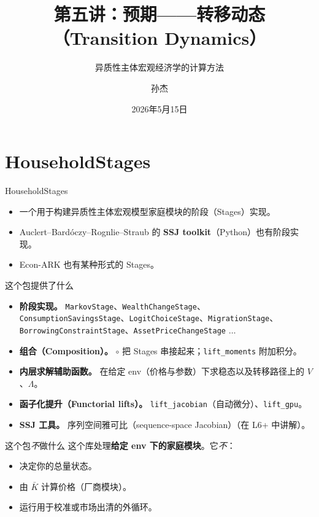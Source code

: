 \documentclass[10pt,aspectratio=169]{beamer}
\title{第五讲：预期——转移动态（Transition Dynamics）}
\subtitle{异质性主体宏观经济学的计算方法}
\author{孙杰}
\institute{多伦多大学}
\date{2026年5月15日}
\begin{document}
\maketitle

\section[HouseholdStages]{HouseholdStages}

\begin{frame}{HouseholdStages}
  \begin{itemize}
    \item 一个用于构建异质性主体宏观模型家庭模块的阶段（Stages）实现。
    \item Auclert--Bardóczy--Rognlie--Straub 的 \textbf{SSJ toolkit}（Python）也有阶段实现。
    \item Econ-ARK 也有某种形式的 Stages。
  \end{itemize}
\end{frame}

\begin{frame}{这个包提供了什么}
  \begin{itemize}
    \item \textbf{阶段实现。} \texttt{MarkovStage}、\texttt{WealthChangeStage}、\texttt{ConsumptionSavingsStage}、\texttt{LogitChoiceStage}、\texttt{MigrationStage}、\texttt{BorrowingConstraintStage}、\texttt{AssetPriceChangeStage} $\dots$
    \item \textbf{组合（Composition）。} \texttt{$\circ$} 把 Stages 串接起来；\texttt{lift\_moments} 附加积分。
    \item \textbf{内层求解辅助函数。} 在给定 env（价格与参数）下求稳态以及转移路径上的 $V$、$\Lambda$。
    \item \textbf{函子化提升（Functorial lifts）。} \texttt{lift\_jacobian}（自动微分）、\texttt{lift\_gpu}。
    \item \textbf{SSJ 工具。} 序列空间雅可比（sequence-space Jacobian）（在 L6+ 中讲解）。
  \end{itemize}
\end{frame}

\begin{frame}{这个包\emph{不}做什么}
  这个库处理\textbf{给定 env 下的家庭模块}。它\emph{不}：
  \begin{itemize}
    \item 决定你的总量状态。
    \item 由 $\bar K$ 计算价格（厂商模块）。
    \item 运行用于校准或市场出清的外循环。
  \end{itemize}
\end{frame}
\end{document}
